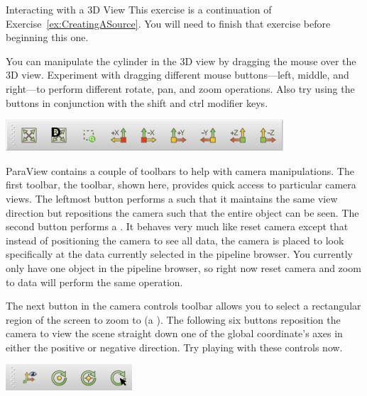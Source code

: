 \begin{exercise}{Interacting with a 3D View}
  \label{ex:InteractingWithA3DView}%
  This exercise is a continuation of Exercise~\ref{ex:CreatingASource}.
  You will need to finish that exercise before beginning this one.

  You can manipulate the cylinder in the 3D view by dragging
  the mouse over the 3D view.  Experiment with dragging different mouse
  buttons---left, middle, and right---to perform different rotate, pan, and
  zoom operations.  Also try using the buttons in conjunction with the
  shift and ctrl modifier keys.

  \begin{inlinefig}
    \includegraphics[width=.83\scw]{images/ToolbarCamera}
  \end{inlinefig}


  ParaView contains a couple of toolbars to help with camera manipulations.
  The first toolbar, the  toolbar, shown here, provides
  quick access to particular camera views.  The leftmost button
   performs a  such that it
  maintains the same view direction but repositions the camera such that
  the entire object can be seen.  The second button 
  performs a .  It behaves very much like reset
  camera except that instead of positioning the camera to see all data, the
  camera is placed to look specifically at the data currently selected in
  the pipeline browser.  You currently only have one object in the pipeline
  browser, so right now reset camera and zoom to data will perform the same
  operation.

  The next button in the camera controls toolbar 
  allows you to select a rectangular region of the screen to zoom to (a
  ).  The following six buttons reposition the
  camera to view the scene straight down one of the global coordinate's
  axes in either the positive or negative direction.  Try playing with
  these controls now.

  \begin{inlinefig}
    \includegraphics[width=.415\scw]{images/ToolbarCenterAxis}
  \end{inlinefig}


\end{exercise}

